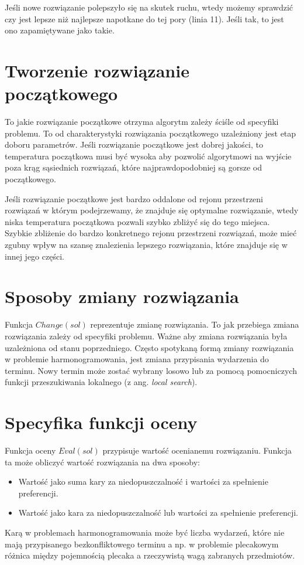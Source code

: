 Jeśli nowe rozwiązanie polepszyło się na skutek ruchu, wtedy możemy sprawdzić
czy jest lepsze niż najlepsze napotkane do tej pory (linia 11). Jeśli tak, to
jest ono zapamiętywane jako takie.

\section{Tworzenie rozwiązanie początkowego}
To jakie rozwiązanie początkowe otrzyma algorytm zależy ściśle od specyfiki
problemu. To od charakterystyki rozwiązania początkowego uzależniony jest etap
doboru parametrów. Jeśli rozwiązanie początkowe jest dobrej jakości, to
temperatura początkowa musi być wysoka aby pozwolić algorytmowi na wyjście poza
krąg sąsiednich rozwiązań, które najprawdopodobniej są gorsze od początkowego.

Jeśli rozwiązanie początkowe jest bardzo oddalone od rejonu przestrzeni
rozwiązań w którym podejrzewamy, że znajduje się optymalne rozwiązanie, wtedy
niska temperatura początkowa pozwali szybko zbliżyć się do tego miejsca. Szybkie
zbliżenie do bardzo konkretnego rejonu przestrzeni rozwiązań, może mieć zgubny
wpływ na szansę znalezienia lepszego rozwiązania, które znajduje się w innej
jego części.

\section{Sposoby zmiany rozwiązania}
Funkcja $Change(sol)$ reprezentuje zmianę rozwiązania. To jak przebiega zmiana
rozwiązania zależy od specyfiki problemu. Ważne aby zmiana rozwiązania była uzależniona
od stanu poprzedniego.
Często spotykaną formą zmiany rozwiązania w problemie harmonogramowania, jest
zmiana przypisania wydarzenia do terminu. Nowy termin może zostać wybrany losowo
lub za pomocą pomocniczych funkcji przeszukiwania lokalnego (z ang.
\emph{local search}).
\newpage
\section{Specyfika funkcji oceny}
Funkcja oceny $Eval(sol)$ przypisuje wartość ocenianemu rozwiązaniu. Funkcja ta
może obliczyć wartość rozwiązania na dwa sposoby:
\begin{itemize}
	\item Wartość jako suma kary za niedopuszczalność i wartości za
		spełnienie preferencji.
	\item Wartość jako kara za niedopuszczalność lub wartości za
		spełnienie preferencji.
\end{itemize}
Karą w problemach harmonogramowania może być liczba wydarzeń, które nie mają
przypisanego bezkonfliktowego terminu a np. w problemie plecakowym różnica między
pojemnością plecaka a rzeczywistą wagą zabranych przedmiotów.

